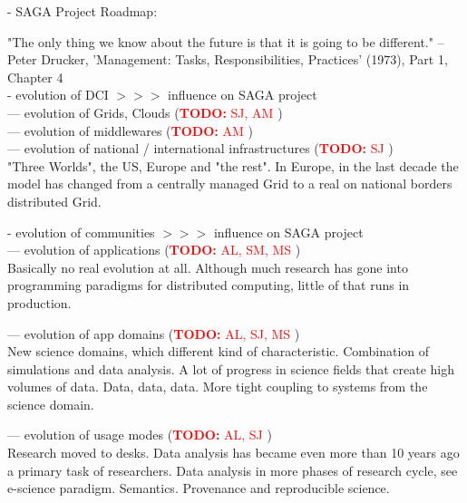 \documentclass{article}
\newcommand{\B}[1]{\textbf{#1}}
\newcommand{\nind}{\noindent}
\newcommand{\todo}[1]{{\textcolor{red}{\B{TODO:} #1 }}}
\begin{document}
 \nind
 - SAGA Project Roadmap:\\

 
 \nind

 "The only thing we know about the future is that it is going to be
 different." -- Peter Drucker, 'Management: Tasks,
 Responsibilities, Practices' (1973), Part 1, Chapter 4\\ 


 - evolution of DCI $>>>$ influence on SAGA project\\
 --- evolution of Grids, Clouds (\todo{SJ, AM})\\
 --- evolution of middlewares (\todo{AM})\\
 --- evolution of national / international infrastructures (\todo{SJ})\\

"Three Worlds", the US, Europe and "the rest".
In Europe, in the last decade the model has changed from a centrally managed Grid to a real on national borders distributed Grid.

 
 \nind
 - evolution of communities  $>>>$ influence on SAGA project\\
 --- evolution of applications (\todo{AL, SM, MS})\\
 
Basically no real evolution at all. Although much research has gone into programming paradigms for distributed computing, little of that runs in production.
 
 --- evolution of app domains (\todo{AL, SJ, MS})\\
 
 New science domains, which different kind of characteristic.
 Combination of simulations and data analysis. A lot of progress in science fields that create high volumes of data.
Data, data, data.
More tight coupling to systems from the science domain.
 
 --- evolution of usage modes (\todo{AL, SJ})\\
 
 Research moved to desks. Data analysis has became even more than 10 years ago a primary task of researchers.
 Data analysis in more phases of research cycle, see e-science paradigm.
Semantics.
Provenance and reproducible science.
  
\end{document}
